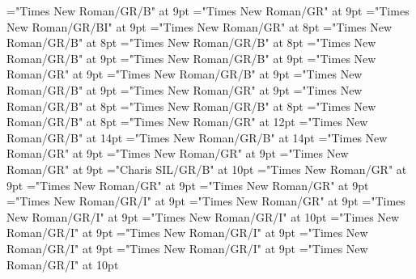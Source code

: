 \documentclass[gps1,twoside]{article}
\begin{document}
\font\xitemxitemcrossrefbefore="Times New Roman/GR/B" at 9pt
\font\xitemxitemcrossreftargetsbefore="Times New Roman/GR" at 9pt
\font\xitemxitemcrossreftypebefore="Times New Roman/GR/BI" at 9pt
\font\xitemxitemexamplebefore="Times New Roman/GR" at 8pt
\font\xitemxitemheadwordbefore="Times New Roman/GR/B" at 8pt
\font\xitemxitemheadwordminorbefore="Times New Roman/GR/B" at 8pt
\font\xitemxitemmainentryrefbefore="Times New Roman/GR/B" at 9pt
\font\xitemxitemmainentryrefminorbefore="Times New Roman/GR/B" at 9pt
\font\xitemxitempronunciationminorbefore="Times New Roman/GR" at 9pt
\font\xitemxitemsensecrossrefbefore="Times New Roman/GR/B" at 9pt
\font\xitemxitemsensemainentryrefbefore="Times New Roman/GR/B" at 9pt
\font\xitemxitemtranslationbefore="Times New Roman/GR" at 9pt
\font\xitemxitemheadwordsubbefore="Times New Roman/GR/B" at 8pt
\font\xitemxitemLexEntrypublishRootMinorPrimaryTargetMLHeadWordPubbefore="Times New Roman/GR/B" at 8pt
\font\xitemxitemLexEntrypublishStemMinorPrimaryTargetMLHeadWordPubbefore="Times New Roman/GR/B" at 8pt
\font\xitemtpi="Times New Roman/GR" at 12pt
\font{}="Times New Roman/GR/B" at 14pt
\font{}="Times New Roman/GR/B" at 14pt
\font{}="Times New Roman/GR" at 9pt
\font\diventryletData="Times New Roman/GR" at 9pt
\font\spandiventryletData="Times New Roman/GR" at 9pt
\font\spanbzhspandiventryletData="Charis SIL/GR/B" at 10pt
\font\sensesentryafterdiventryletData="Times New Roman/GR" at 9pt
\font\spanspandiventryletData="Times New Roman/GR" at 9pt
\font\sensespanspandiventryletData="Times New Roman/GR" at 9pt
\font\morphosyntaxanalysissensesensesentrysensespanspandiventryletData="Times New Roman/GR/I" at 9pt
\font\morphosyntaxanalysissensesensesentryaftersensespanspandiventryletData="Times New Roman/GR" at 9pt
\font\partofspeechmorphosyntaxanalysissensesensesentrysensespanspandiventryletData="Times New Roman/GR/I" at 9pt
\font\spanenpartofspeechmorphosyntaxanalysissensesensesentrysensespanspandiventryletData="Times New Roman/GR/I" at 10pt
\font\spanmorphosyntaxanalysissensesensesentrysensespanspandiventryletData="Times New Roman/GR/I" at 9pt
\font\slotsmorphosyntaxanalysissensesensesentrybeforemorphosyntaxanalysissensesensesentrysensespanspandiventryletData="Times New Roman/GR/I" at 9pt
\font\slotspanmorphosyntaxanalysissensesensesentrysensespanspandiventryletData="Times New Roman/GR/I" at 9pt
\font\spanslotspanmorphosyntaxanalysissensesensesentrysensespanspandiventryletData="Times New Roman/GR/I" at 9pt
\font\spanenspanslotspanmorphosyntaxanalysissensesensesentrysensespanspandiventryletData="Times New Roman/GR/I" at 10pt
\end{document}
